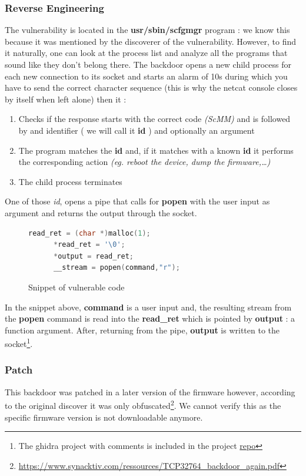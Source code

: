 \documentclass{article}
\begin{document}
\subsubsection{Reverse Engineering}
The vulnerability is located in the \textbf{usr/sbin/scfgmgr} program : we know this because it was mentioned by the discoverer of the vulnerability. However, to find it naturally, one can look at the process list and analyze all the programs that sound like they don't belong there. The backdoor opens a new child process for each new connection to its socket and starts an alarm of 10s during which you have to send the correct character sequence (this is why the netcat console closes by itself when left alone) then it : 
\begin{enumerate}
	\item Checks if the response starts with the correct code \textit{(ScMM)} and is followed by and identifier ( we will call it \textbf{id} ) and optionally an argument
	\item The program matches the \textbf{id} and, if it matches with a known \textbf{id} it performs the corresponding action \textit{(eg. reboot the device, dump the firmware,\dots)}
	\item The child process terminates
\end{enumerate}

\noindent One of those \textit{id}, opens a pipe that calls for \textbf{popen} with the user input as argument and returns the output through the socket.
\begin{figure}[!ht]
	\begin{lstlisting}[language=c]
	  read_ret = (char *)malloc(1);
	  *read_ret = '\0';
	  *output = read_ret;
	  __stream = popen(command,"r");	
	\end{lstlisting}
	\caption{Snippet of vulnerable code}	
\end{figure}
In the snippet above, \textbf{command} is a user input and, the resulting stream from the \textbf{popen} command is read into the \textbf{read\_ret} which is pointed by \textbf{output} : a function argument. After, returning from the pipe, \textbf{output} is written to the socket\footnote{The ghidra project with comments is included in the project \href{https://github.com/EstAK/WAP4410N}{repo}}.
\subsubsection{Patch}
This backdoor was patched in a later version of the firmware however, according to the original discover it was only obfuscated\footnote{\url{https://www.synacktiv.com/ressources/TCP32764_backdoor_again.pdf}}. We cannot verify this as the specific firmware version is not downloadable anymore.
\end{document}
